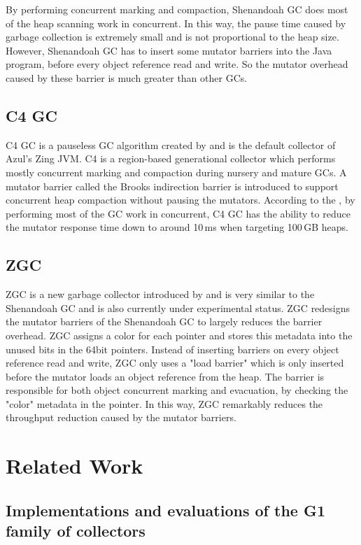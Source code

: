 By performing concurrent marking and compaction, Shenandoah GC does most of the
heap scanning work in concurrent. In this way, the pause time caused by garbage collection
is extremely small and is not proportional to the heap size.
However, Shenandoah GC has to insert some mutator barriers into the Java program,
before every object reference read and write. So the mutator overhead caused by
these barrier is much greater than other GCs.

\subsection{C4 GC}

C4 GC is a pauseless GC algorithm created by \cite{tene2011c4} and is the default
collector of Azul's Zing JVM. C4 is a region-based generational collector which
performs mostly concurrent marking and compaction during nursery and mature GCs.
A mutator barrier called the Brooks indirection barrier is introduced to support
concurrent heap compaction without pausing the mutators. According to the \cite{tene2011c4},
by performing most of the GC work in concurrent, C4 GC has the ability to reduce the
mutator response time down to around 10\,ms when targeting 100\,GB heaps.

\subsection{ZGC}

ZGC is a new garbage collector introduced by \cite{liden_karlsson_2018} and
is very similar to the Shenandoah GC and is also currently under experimental status.
ZGC redesigns the mutator barriers of the Shenandoah GC to largely reduces the barrier
overhead.
ZGC assigns a color for each pointer and stores this metadata into the
unused bits in the 64bit pointers.
Instead of inserting barriers on every object reference read and write,
ZGC only uses a "load barrier" which is only inserted before the mutator loads an
object reference from the heap. The barrier is responsible for both object concurrent marking
and evacuation, by checking the "color" metadata in the pointer.
In this way, ZGC remarkably reduces the throughput reduction caused by the mutator
barriers.

\section{Related Work}
\label{sec:relatedwork}

\subsection{Implementations and evaluations of the G1 family of collectors}

